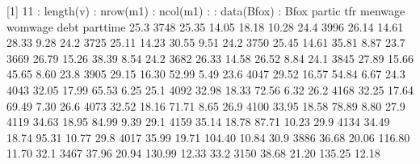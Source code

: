 \documentclass[10pt,a4paper]{article}
\begin{document}
{{[1] 11
\newline
: length(v)
\newline
: nrow(m1)
\newline
: ncol(m1)
\newline
: : data(Bfox)
\newline
: Bfox
\newline
partic  tfr menwage womwage   debt parttime
   25.3 3748   25.35   14.05  18.18    10.28
   24.4 3996   26.14   14.61  28.33     9.28
   24.2 3725   25.11   14.23  30.55     9.51
   24.2 3750   25.45   14.61  35.81     8.87
   23.7 3669   26.79   15.26  38.39     8.54
   24.2 3682   26.33   14.58  26.52     8.84
   24.1 3845   27.89   15.66  45.65     8.60
   23.8 3905   29.15   16.30  52.99     5.49
   23.6 4047   29.52   16.57  54.84     6.67
   24.3 4043   32.05   17.99  65.53     6.25
   25.1 4092   32.98   18.33  72.56     6.32
   26.2 4168   32.25   17.64  69.49     7.30
   26.6 4073   32.52   18.16  71.71     8.65
   26.9 4100   33.95   18.58  78.89     8.80
   27.9 4119   34.63   18.95  84.99     9.39
   29.1 4159   35.14   18.78  87.71    10.23
   29.9 4134   34.49   18.74  95.31    10.77
   29.8 4017   35.99   19.71 104.40    10.84
   30.9 3886   36.68   20.06 116.80    11.70
   32.1 3467   37.96   20.94 130.99    12.33
   33.2 3150   38.68   21.20 135.25    12.18
}}
\end{document}
